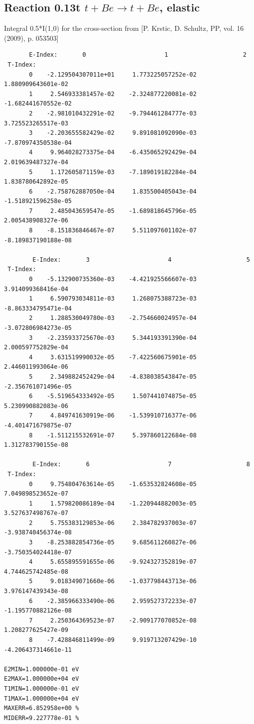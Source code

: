 \documentclass[12pt,dvipdfmx]{article}
\begin{document}
\subsection{
Reaction 0.13t  $t + Be \rightarrow t + Be$, elastic}

Integral 0.5*I(1,0) for the cross-section from [P. Krstic, D. Schultz, PP, vol. 16 (2009), p. 053503]

\begin{small}\begin{verbatim}
       E-Index:       0                      1                     2
 T-Index:
       0    -2.129504307011e+01     1.773225057252e-02     1.880909643601e-02
       1     2.546933381457e-02    -2.324877220081e-02    -1.682441670552e-02
       2    -2.981010432291e-02    -9.794461284777e-03     3.725523265517e-03
       3    -2.203655582429e-02     9.891081092090e-03    -7.870974350538e-04
       4     9.964028273375e-04    -6.435065292429e-04     2.019639487327e-04
       5     1.172605871159e-03    -7.189019182284e-04     1.838780642892e-05
       6    -2.758762887050e-04     1.835500405043e-04    -1.518921596258e-05
       7     2.485043659547e-05    -1.689818645796e-05     2.005438908327e-06
       8    -8.151836846467e-07     5.511097601102e-07    -8.189837190188e-08

        E-Index:       3                      4                     5
 T-Index:
       0    -5.132900735360e-03    -4.421925566607e-03     3.914099368416e-04
       1     6.590793034811e-03     1.268075388723e-03    -8.863334795471e-04
       2     1.288530049780e-03    -2.754660024957e-04    -3.072806984273e-05
       3    -2.235933725670e-03     5.344193391390e-04     2.000597752829e-04
       4     3.631519990032e-05    -7.422560675901e-05     2.446011993064e-06
       5     2.349882452429e-04    -4.838038543847e-05    -2.356761071496e-05
       6    -5.519654333492e-05     1.507441074875e-05     5.230990882083e-06
       7     4.849741630919e-06    -1.539910716377e-06    -4.401471679875e-07
       8    -1.511215532691e-07     5.397860122684e-08     1.312783790155e-08

        E-Index:       6                      7                     8
 T-Index:
       0     9.754804763614e-05    -1.653532824608e-05     7.049898523652e-07
       1     1.579820086189e-04    -1.220944882003e-05     3.527637498767e-07
       2     5.755383129853e-06     2.384782937003e-07    -3.938740456374e-08
       3    -8.253882854736e-05     9.685611260827e-06    -3.750354024418e-07
       4     5.655895591655e-06    -9.924327352819e-07     4.744625742485e-08
       5     9.018349071660e-06    -1.037798443713e-06     3.976147439343e-08
       6    -2.385966333490e-06     2.959527372233e-07    -1.195770882126e-08
       7     2.250364369523e-07    -2.909177070852e-08     1.208277625427e-09
       8    -7.428846811499e-09     9.919713207429e-10    -4.206437314661e-11

E2MIN=1.000000e-01 eV
E2MAX=1.000000e+04 eV
T1MIN=1.000000e-01 eV
T1MAX=1.000000e+04 eV
MAXERR=6.852958e+00 %
MIDERR=9.227778e-01 %
\end{verbatim}\end{small}
\newpage
\end{document}
